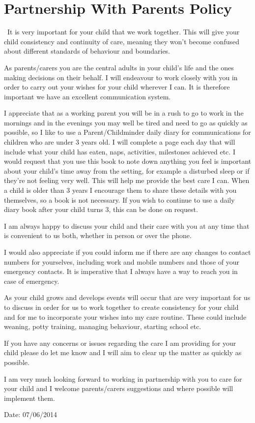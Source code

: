 

\section{Partnership With Parents Policy}

~It is very important for your child that we work together. This will
give your child consistency and continuity of care, meaning they won't
become confused about different standards of behaviour and boundaries.

As parents/carers you are the central adults in your child's life and
the ones making decisions on their behalf. I will endeavour to work
closely with you in order to carry out your wishes for your child
wherever I can. It is therefore important we have an excellent
communication system.

I appreciate that as a working parent you will be in a rush to go to
work in the mornings and in the evenings you may well be tired and need
to go as quickly as possible, so I like to use a Parent/Childminder
daily diary for communications for children who are under 3 years old. I
will complete a page each day that will include what your child has
eaten, naps, activities, milestones achieved etc. I would request that
you use this book to note down anything you feel is important about your
child's time away from the setting, for example a disturbed sleep or if
they're not feeling very well. This will help me provide the best care I
can. When a child is older than 3 years I encourage them to share these
details with you themselves, so a book is not necessary. If you wish to
continue to use a daily diary book after your child turns 3, this can be
done on request.

I am always happy to discuss your child and their care with you at any
time that is convenient to us both, whether in person or over the phone.

I would also appreciate if you could inform me if there are any changes
to contact numbers for yourselves, including work and mobile numbers and
those of your emergency contacts. It is imperative that I always have a
way to reach you in case of emergency.

As your child grows and develops events will occur that are very
important for us to discuss in order for us to work together to create
consistency for your child and for me to incorporate your wishes into my
care routine. These could include weaning, potty training, managing
behaviour, starting school etc.

If you have any concerns or issues regarding the care I am providing for
your child please do let me know and I will aim to clear up the matter
as quickly as possible.

I am very much looking forward to working in partnership with you to
care for your child and I welcome parents/carers suggestions and where
possible will implement them.

Date: 07/06/2014


